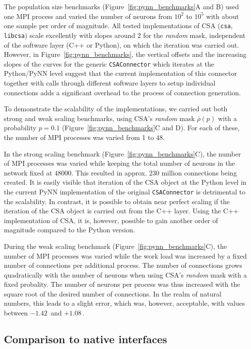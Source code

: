 \documentclass{frontiersSCNS} %
\newcommand{\permil}{\,\textperthousand\xspace}
\newcommand{\Figure}[2]{Figure~\ref{#2}}
\newcommand{\Figure}[2]{Figure~#1}
\begin{document}
The population size benchmarks (\Figure{4}{fig:pynn_benchmarks}A and
B) used one MPI process and varied the number of neurons from $10^2$
to $10^5$ with about one sample per order of magnitude. All tested
implementations of CSA (\verb|csa|, \verb|libcsa|) scale excellently
with slopes around 2 for the \emph{random} mask, independent of the
software layer (C++ or Python), on which the iteration was carried
out. However, in \Figure{4}{fig:pynn_benchmarks}, the vertical offsets
and the increasing slopes of the curves for the generic
\verb|CSAConnector| which iterates at the Python/PyNN level suggest
that the current implementation of this connector together with calls
through different software layers to setup individual connections adds
a significant overhead to the process of connection generation.

To demonstrate the scalability of the implementations, we carried out
both strong and weak scaling benchmarks, using CSA's \emph{random}
mask $\bar{\rho}(p)$ with a probability $p = 0.1$
(\Figure{4}{fig:pynn_benchmarks}C and D). For each of these, the
number of MPI processes was varied from 1 to 48.

In the strong scaling benchmark (\Figure{4}{fig:pynn_benchmarks}C),
the number of MPI processes was varied while keeping the total number
of neurons in the network fixed at $48000$. This resulted in
approx. 230 million connections being created. It is easily visible
that iteration of the CSA object at the Python level in the current
PyNN implementation of the original \verb|CSAConnector| is detrimental
to the scalability. In contrast, it is possible to obtain near perfect
scaling if the iteration of the CSA object is carried out from the C++
layer. Using the C++ implementation of CSA, it is, however, possible
to gain another order of magnitude compared to the Python version.

During the weak scaling benchmark (\Figure{4}{fig:pynn_benchmarks}C),
the number of MPI processes was varied while the work load was
increased by a fixed number of connections per additional process.
The number of connections grows quadratically with the number of
neurons when using CSA's \emph{random} mask with a fixed
probality. The number of neurons per process was thus increased with
the square root of the desired number of connections. In the realm of
natural numbers, this leads to a slight error, which was, however,
acceptable, with values between $-1.42$\permil and $+1.08$\permil.

\subsection{Comparison to native interfaces}
\end{document}
